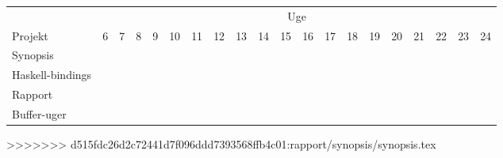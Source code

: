 \documentclass[a4paper,oneside, draft]{memoir}
\begin{document}
\noindent
\begin{landscape}
\begin{center}



\begin{tabular}{l||ccccccccccccccccccc}
& \multicolumn{19}{c}{Uge} \\
Projekt & 6 & 7 & 8 & 9 & 10 & 11 & 12 & 13 & 14 & 15 & 16 & 17 & 18 &
19 & 20 & 21 & 22 & 23 & 24\\ \hline \hline
Synopsis & \multicolumn{3}{c}{\cellcolor{black}} & & & &
&&&&&&&&&&&&\\  
Haskell-bindings & & & \multicolumn{2}{c}{\cellcolor{red}} \\  
Rapport & & & & \multicolumn{5}{c}{\cellcolor{lightgrey}} &  \multicolumn{8}{c}{\cellcolor{grey}}\\  
Buffer-uger & \multicolumn{16}{c}{} & \multicolumn{3}{c}{\cellcolor{blue}} \\  
\end{tabular}
\end{center}
\end{landscape}

>>>>>>> d515fdc26d2c72441d7f096ddd7393568ffb4c01:rapport/synopsis/synopsis.tex
\end{document}
